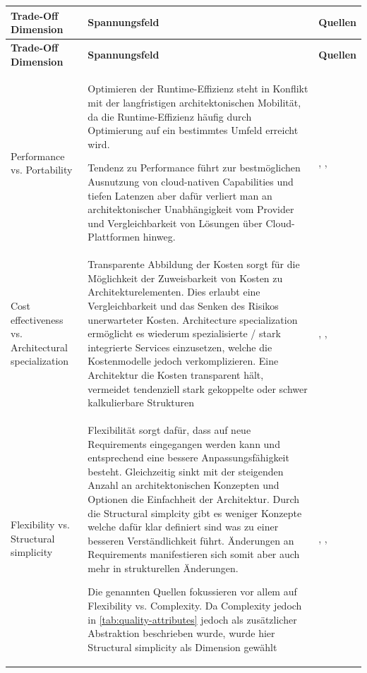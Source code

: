 \begin{longtable}{|
  L{3cm}|
  p{\dimexpr\textwidth-6cm-6\arrayrulewidth\relax}|
  L{3cm}|
}
    \hline
    \textbf{Trade-Off Dimension} & \textbf{Spannungsfeld} & \textbf{Quellen} \\
    \hline
    \endfirsthead

    \hline
    \textbf{Trade-Off Dimension} & \textbf{Spannungsfeld} & \textbf{Quellen} \\
    \hline
    \endhead

    Performance vs. Portability &
    Optimieren der Runtime-Effizienz steht in Konflikt mit der langfristigen architektonischen Mobilität, da die Runtime-Effizienz häufig durch Optimierung auf ein bestimmtes Umfeld erreicht wird.

    Tendenz zu Performance führt zur bestmöglichen Ausnutzung von cloud-nativen Capabilities und tiefen Latenzen aber dafür verliert man an architektonischer Unabhängigkeit vom Provider und Vergleichbarkeit von Lösungen über Cloud-Plattformen hinweg. &
    \cite{gibilisco_methodology_2016}, \cite{emmanni_architecting_2020}, \cite{papaioannou_architecture_2013-1}
    \\
    \hline

    Cost effectiveness vs. Architectural specialization &
    Transparente Abbildung der Kosten sorgt für die Möglichkeit der Zuweisbarkeit von Kosten zu Architekturelementen. Dies erlaubt eine Vergleichbarkeit und das Senken des Risikos unerwarteter Kosten. Architecture specialization ermöglicht es wiederum  spezialisierte / stark integrierte Services einzusetzen, welche die Kostenmodelle jedoch verkomplizieren. Eine Architektur die Kosten transparent hält, vermeidet tendenziell stark gekoppelte oder schwer kalkulierbare Strukturen &
    \cite{arul_data_2022}, \cite{sai_leading_2025}, \cite{emmanni_architecting_2020}
    \\
    \hline

    Flexibility vs. Structural simplicity &
    Flexibilität sorgt dafür, dass auf neue Requirements eingegangen werden kann und entsprechend eine bessere Anpassungsfähigkeit besteht. Gleichzeitig sinkt mit der steigenden Anzahl an architektonischen Konzepten und Optionen die Einfachheit der Architektur. Durch die Structural simplcity gibt es weniger Konzepte welche dafür klar definiert sind was zu einer besseren Verständlichkeit führt. Änderungen an Requirements manifestieren sich somit aber auch mehr in strukturellen Änderungen.
    
    Die genannten Quellen fokussieren vor allem auf Flexibility vs. Complexity. Da Complexity jedoch in \autoref{tab:quality-attributes} jedoch als zusätzlicher Abstraktion beschrieben wurde, wurde hier Structural simplicity als Dimension gewählt&
    \cite{gibilisco_methodology_2016}, \cite{papaioannou_architecture_2013}, \cite{arul_data_2022}
    \\
    \hline


\end{longtable}
